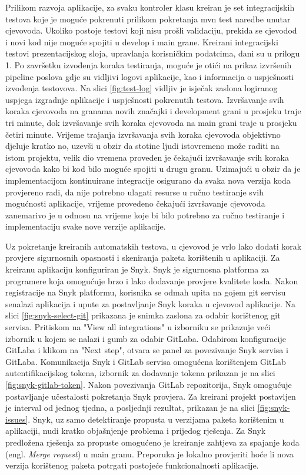 \documentclass[a4paper,12pt,oneside]{article}
\begin{document}
Prilikom razvoja aplikacije, za svaku kontroler klasu kreiran je set integracijskih testova koje je moguće pokrenuti prilikom pokretanja mvn test naredbe unutar cjevovoda. Ukoliko postoje testovi koji nisu prošli validaciju, prekida se cjevodod i novi kod nije moguće spojiti u develop i main grane. Kreirani integracijski testovi prezentacijskog sloja, upravlanja korisničkim podatcima, dani su u prilogu 1. Po završetku izvođenja koraka testiranja, moguće je otići na prikaz izvršenih pipeline poslova gdje su vidljivi logovi aplikacije, kao i informacija o uspješnosti izvođenja testovova. Na slici \ref{fig:test-log} vidljiv je isječak zaslona logiranog uspjega izgradnje aplikacije i uspješnosti pokrenutih testova. Izvršavanje svih koraka cjevovoda na granama novih značajki i development grani u prosjeku traje tri minute, dok izvršavanje svih koraka cjevovoda na main grani traje u prosjeku četiri minute. Vrijeme trajanja izvršavanja svih koraka cjevovoda objektivno djeluje kratko no, uzevši u obzir da stotine ljudi istovremeno može raditi na istom projektu, velik dio vremena proveden je čekajući izvršavanje svih koraka cjevovoda kako bi kod bilo moguće spojiti u drugu granu. Uzimajući u obzir da je implementacijom kontinuirane integracije osigurano da svaka nova verzija koda provjereno radi, da nije potrebno ulagati resurse u ručno testiranje svih mogućnosti aplikacije, vrijeme provedeno čekajući izvršavanje cjevovoda zanemarivo je u odnosu na vrijeme koje bi bilo potrebno za ručno testiranje i implementaciju svake nove verzije aplikacije. 

Uz pokretanje kreiranih automatskih testova, u cjevovod je vrlo lako dodati korak provjere sigurnosnih opasnosti i skeniranja paketa korištenih u aplikaciji. Za kreiranu aplikaciju konfiguriran je Snyk. Snyk je sigurnosna platforma za programere koja omogućuje brzo i lako dodavanje provjere kvalitete koda. Nakon registracije na Snyk platformu, korisnika se odmah upita na gojem git servisu senalazi aplikacija i upute za postavljanje Snyk koraka u cjevovod aplikacije. Na slici \ref{fig:snyk-select-git} prikazana je snimka zaslona za odabir korištenog git servisa. Pritiskom na "View all integrations" u izborniku se prikazuje veći izbornik u kojem se nalazi i gumb za odabir GitLaba. Odabirom konfiguracije GitLaba i klikom na "Next step", otvara se panel za povezivanje Snyk servisa i GitLaba. Komunikacija Snyk i GitLab servisa omogućena korištenjem GitLab autentifikacijskog tokena, izbornik za dodavanje tokena prikazan je na slici \ref{fig:snyk-gitlab-token}. Nakon povezivanja GitLab repozitorija, Snyk omogućuje postavljanje učestalosti pokretanja Snyk provjera. Za kreirani projekt postavljen je interval od jednog tjedna, a posljednji rezultat, prikazan je na slici \ref{fig:snyk-issues}. Snyk, uz samo detektiranje propusta u verzijama paketa korištenim u aplikaciji, nudi kratko objašnjenje problema i prijedog rješenja. Za Snyk predložena rješenja za propuste omogućeno je kreiranje zahtjeva za spajanje koda (engl. \textit{Merge request}) u main granu. Preporuka je lokalno provjeriti hoće li nova verzija korištenog paketa potrgati postojeće funkcionalnosti aplikacije.
\end{document}
